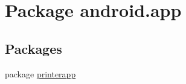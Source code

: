 \hypertarget{namespaceandroid_1_1app}{}\section{Package android.\+app}
\label{namespaceandroid_1_1app}
\subsection*{Packages}
\begin{DoxyCompactItemize}
\item 
package \hyperlink{namespaceandroid_1_1app_1_1printerapp}{printerapp}
\end{DoxyCompactItemize}
